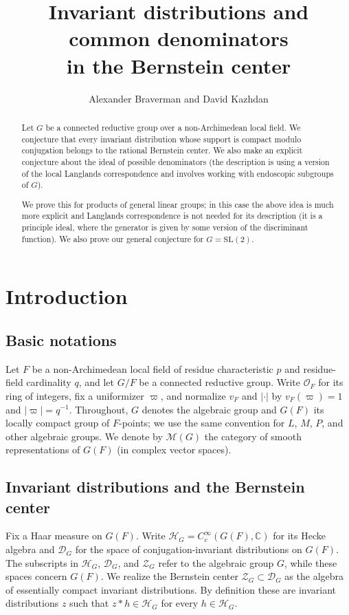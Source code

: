 \documentclass[11pt,a4paper]{amsart}
\newcommand{\OO}{\mathcal O}
\newcommand{\mcH}{\mathcal H}
\newcommand{\mcD}{\mathcal D}
\newcommand{\mcZ}{\mathcal Z}
\theoremstyle{definition}
\theoremstyle{remark}
\begin{document}
\title{Invariant distributions and common denominators\\
in the Bernstein center}
\author{Alexander Braverman and David Kazhdan}
\begin{abstract}
Let $G$ be a connected reductive group over a non-Archimedean local
field. We conjecture that every invariant distribution whose support is compact modulo conjugation belongs to the rational Bernstein center. We also make an explicit conjecture about the ideal of possible denominators (the description is using a version of the local Langlands correspondence and involves working with endoscopic subgroups of $G$). 

We prove this for products of general linear groups; in this case the above idea is much more explicit and Langlands correspondence is not needed for its description (it is a principle ideal, where the generator is given by some version of the discriminant function). We also prove our general conjecture for  $G=\mathrm{SL}(2)$.
\end{abstract}
\maketitle

\section{Introduction}
\subsection{Basic notations}
Let $F$ be a non-Archimedean local field of residue characteristic $p$
and residue-field cardinality $q$, and let $G/F$ be a connected
reductive group. Write $\OO_F$ for its ring of integers, fix a uniformizer
$\varpi$, and normalize $v_F$ and $|\cdot|$ by
$v_F(\varpi)=1$ and $|\varpi|=q^{-1}$.
Throughout, $G$ denotes the algebraic group and
$G(F)$ its locally compact group of $F$-points; we use the same
convention for $L$, $M$, $P$, and other algebraic groups. We denote by $\mathcal M(G)$ the category of smooth representations of $G(F)$
(in complex vector spaces).
\subsection{Invariant distributions and the Bernstein center}
Fix a Haar measure on $G(F)$. Write
$\mcH_G=C_c^\infty(G(F),\mathbb C)$ for its Hecke algebra and
$\mcD_G$ for the space of conjugation-invariant distributions on $G(F)$.
The subscripts in $\mcH_G$, $\mcD_G$, and $\mcZ_G$ refer to the
algebraic group $G$, while these spaces concern $G(F)$.
We realize the Bernstein center $\mcZ_G\subset\mcD_G$ as the algebra
of essentially compact invariant distributions. By definition these are invariant distributions $z$ such that  
$z*h\in\mcH_G$ for every $h\in\mcH_G$.
\end{document}
